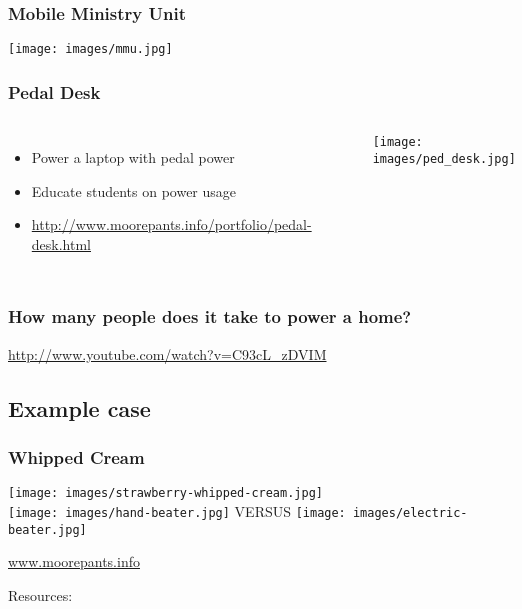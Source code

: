 \documentclass[]{beamer}
\begin{document}
\frame
{
  \frametitle{Mobile Ministry Unit}
  \begin{center}
  \texttt{[image: images/mmu.jpg]}
  \end{center}
}
\frame
{
  \frametitle{Pedal Desk}
  \begin{columns}[t]
    \column{6cm}
    \begin{itemize}
      \item Power a laptop with pedal power
      \item Educate students on power usage
      \item \url{http://www.moorepants.info/portfolio/pedal-desk.html}
    \end{itemize}
    \column{5cm}
    \begin{center}
    \begin{figure}[]
      \texttt{[image: images/ped\_desk.jpg]}
    \end{figure}
    \end{center}
  \end{columns}
}
\frame
{
  \frametitle{How many people does it take to power a home?}
  \url{http://www.youtube.com/watch?v=C93cL_zDVIM}
}
\subsection{Example case}
\frame
{
  \frametitle{Whipped Cream}
  \begin{center}
  \texttt{[image: images/strawberry-whipped-cream.jpg]}
  \\
  \texttt{[image: images/hand-beater.jpg]}
  \large{VERSUS}
  \texttt{[image: images/electric-beater.jpg]}
  \end{center}
}
\begin{frame}[shrink=30]
\begin{center}
  \alert{\url{www.moorepants.info}}\\
\end{center}
Resources:
\nocite{McCullagh1977}
\nocite{Wilson1986}
\nocite{Wilson2004}
\nocite{Dean2008}
\nocite{Jansen2011}

\small
\end{frame}
\end{document}
